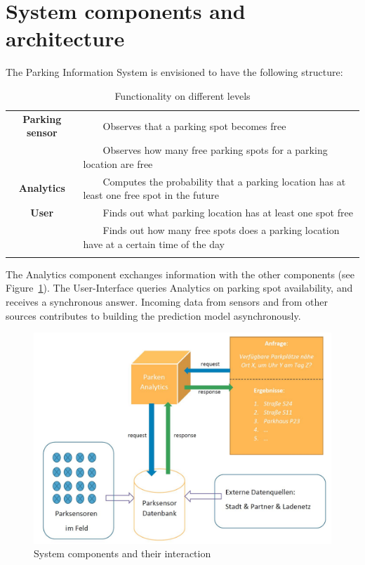 \documentclass{article}
\newcommand{\tabitem}{~~\llap{\textbullet}~~}
\begin{document}
\section{System components and architecture}
The Parking Information System is envisioned to have the following structure:
{\small
\begin{longtable}{| c | >{\raggedright\arraybackslash}p{9cm} |}%
    \hline
     & \multicolumn{1}{c|}{\textbf{Queries}} \\ \hline
    \textbf{Parking sensor} & \tabitem Observes that a parking spot becomes free \\ 
     		   & \tabitem Observes how many free parking spots for a parking location are free \\ \hline 
    \textbf{Analytics} & \tabitem Computes the probability that a parking location has at least one free spot in the future \\ \hline
    \textbf{User} & \tabitem Finds out what parking location has at least one spot free \\ 
    	& \tabitem Finds out how many free spots does a parking location have at a certain time of the day \\ \hline
	\caption{Functionality on different levels}
 	\label{tabelle}
\end{longtable}}

The Analytics component exchanges information with the other components (see Figure~\ref{fig:architektur}). The User-Interface queries Analytics on parking spot availability, and receives a synchronous answer. Incoming data from sensors and from other sources contributes to building the prediction model asynchronously.

\vspace{4mm}
\begin{figure}[!ht]
    \centering
    \includegraphics[width=4.5in]{Architektur}
    \caption{System components and their interaction}
    \label{fig:architektur}
\end{figure}
\end{document}
